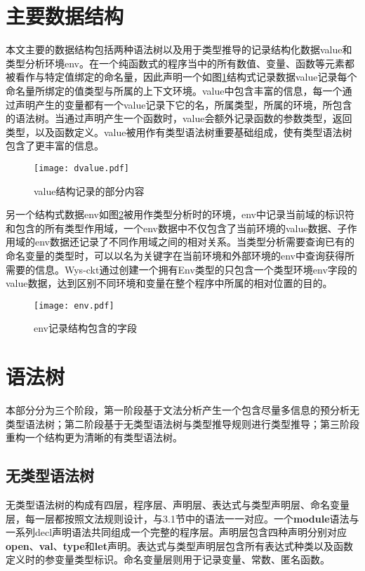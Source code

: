\section{主要数据结构}
本文主要的数据结构包括两种语法树以及用于类型推导的记录结构化数据value和类型分析环境env。在一个纯函数式的程序当中的所有数值、变量、函数等元素都被看作与特定值绑定的命名量，因此声明一个如图\ref{fig:dvalue}结构式记录数据value记录每个命名量所绑定的值类型与所属的上下文环境。value中包含丰富的信息，每一个通过声明产生的变量都有一个value记录下它的名，所属类型，所属的环境，所包含的语法树。当通过声明产生一个函数时，value会额外记录函数的参数类型，返回类型，以及函数定义。value被用作有类型语法树重要基础组成，使有类型语法树包含了更丰富的信息。 
\begin{figure}[!htbp]
    \centering
    \texttt{[image: dvalue.pdf]}
    \caption{value结构记录的部分内容}
    \label{fig:dvalue}
\end{figure}
另一个结构式数据env如图\ref{fig:env}被用作类型分析时的环境，env中记录当前域的标识符和包含的所有类型作用域，一个env数据中不仅包含了当前环境的value数据、子作用域的env数据还记录了不同作用域之间的相对关系。当类型分析需要查询已有的命名变量的类型时，可以以名为关键字在当前环境和外部环境的env中查询获得所需要的信息。Wys-ckt通过创建一个拥有Env类型的只包含一个类型环境env字段的value数据，达到区别不同环境和变量在整个程序中所属的相对位置的目的。
\begin{figure}[!htbp]
    \centering
    \texttt{[image: env.pdf]}
    \caption{env记录结构包含的字段}
    \label{fig:env}
\end{figure}
\section{语法树}
本部分分为三个阶段，第一阶段基于文法分析产生一个包含尽量多信息的预分析无类型语法树；第二阶段基于无类型语法树与类型推导规则进行类型推导；第三阶段重构一个结构更为清晰的有类型语法树。
\subsection{无类型语法树}
无类型语法树的构成有四层，程序层、声明层、表达式与类型声明层、命名变量层，每一层都按照文法规则设计，与3.1节中的语法一一对应。一个\textbf{module}语法与一系列decl声明语法共同组成一个完整的程序层。声明层包含四种声明分别对应\textbf{open}、\textbf{val}、\textbf{type}和\textbf{let}声明。表达式与类型声明层包含所有表达式种类以及函数定义时的参变量类型标识。命名变量层则用于记录变量、常数、匿名函数。

